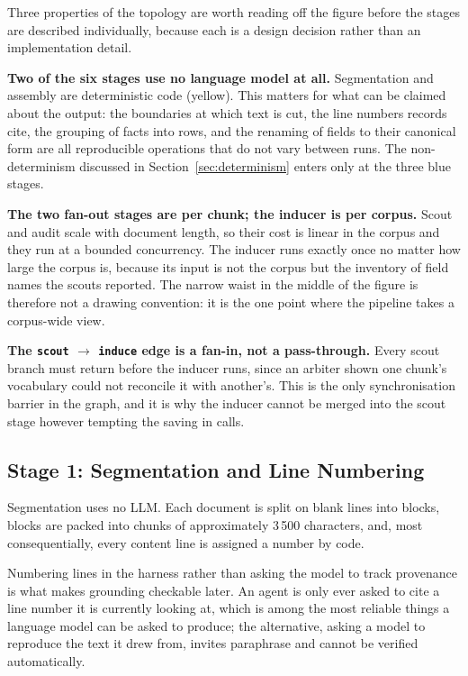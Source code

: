 \documentclass[11pt]{article}
\begin{document}
Three properties of the topology are worth reading off the figure before the
stages are described individually, because each is a design decision rather than
an implementation detail.

\textbf{Two of the six stages use no language model at all.} Segmentation and
assembly are deterministic code (yellow). This matters for what can be claimed
about the output: the boundaries at which text is cut, the line numbers records
cite, the grouping of facts into rows, and the renaming of fields to their
canonical form are all reproducible operations that do not vary between runs. The
non-determinism discussed in Section~\ref{sec:determinism} enters only at the
three blue stages.

\textbf{The two fan-out stages are per chunk; the inducer is per corpus.} Scout
and audit scale with document length, so their cost is linear in the corpus and
they run at a bounded concurrency. The inducer runs exactly once no matter how
large the corpus is, because its input is not the corpus but the inventory of
field names the scouts reported. The narrow waist in the middle of the figure is
therefore not a drawing convention: it is the one point where the pipeline takes
a corpus-wide view.

\textbf{The \texttt{scout} $\rightarrow$ \texttt{induce} edge is a fan-in, not a
pass-through.} Every scout branch must return before the inducer runs, since an
arbiter shown one chunk's vocabulary could not reconcile it with another's. This
is the only synchronisation barrier in the graph, and it is why the inducer
cannot be merged into the scout stage however tempting the saving in calls.

\subsection{Stage 1: Segmentation and Line Numbering}
\label{sec:stage_segment}
Segmentation uses no LLM. Each document is split on blank lines into blocks,
blocks are packed into chunks of approximately 3\,500 characters, and, most
consequentially, every content line is assigned a number by code.

Numbering lines in the harness rather than asking the model to track provenance
is what makes grounding checkable later. An agent is only ever asked to cite a
line number it is currently looking at, which is among the most reliable things a
language model can be asked to produce; the alternative, asking a model to
reproduce the text it drew from, invites paraphrase and cannot be verified
automatically.
\end{document}
